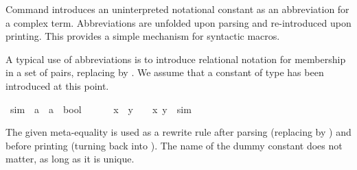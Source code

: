 \begin{isabellebody}
\begin{isamarkuptext}
Command  introduces an uninterpreted notational
constant as an abbreviation for a complex term. Abbreviations are
unfolded upon parsing and re-introduced upon printing. This provides a
simple mechanism for syntactic macros.

A typical use of abbreviations is to introduce relational notation for
membership in a set of pairs, replacing  by
. We assume that a constant  of type
 has been introduced at this point.%
\end{isamarkuptext}%
\isamarkuptrue%
\isamarkupfalse%
\ sim{}\ {\isacharcolon}{\isacharcolon}\ {\isachardoublequoteopen}{\isacharprime}a\ {\isasymRightarrow}\ {\isacharprime}a\ {\isasymRightarrow}\ bool{\isachardoublequoteclose}\ \ \ {\isacharparenleft}\ {\isachardoublequoteopen}{\isasymapprox}{\isachardoublequoteclose}\ {}{}{\isacharparenright}\isanewline
{}\ {\isachardoublequoteopen}x\ {\isasymapprox}\ y\ \ {\isasymequiv}\ \ {\isacharparenleft}x{\isacharcomma}\ y{\isacharparenright}\ {\isasymin}\ sim{\isachardoublequoteclose}%
\begin{isamarkuptext}%
\noindent The given meta-equality is used as a rewrite rule
after parsing (replacing \mbox{} by ) and before printing (turning  back into
\mbox{}). The name of the dummy constant 
does not matter, as long as it is unique.


\end{isamarkuptext}
\end{isabellebody}
